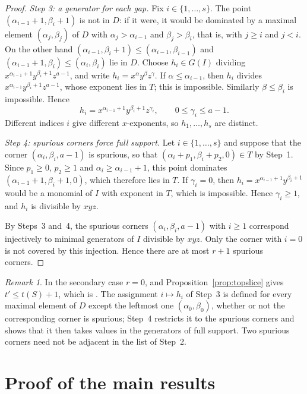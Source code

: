 \documentclass{amsart}
\theoremstyle{definition}
\theoremstyle{remark}
\newtheorem{remark}[theorem]{Remark}
\numberwithin{equation}{section}
\begin{document}
\begin{proof}
\emph{Step 3: a generator for each gap.} Fix $i\in\{1,\dots,s\}$. The point $(\alpha_{i-1}+1,\beta_i+1)$ is not in $D$: if it were, it would be dominated by a maximal element $(\alpha_j,\beta_j)$ of $D$ with $\alpha_j>\alpha_{i-1}$ and $\beta_j>\beta_i$, that is, with $j\ge i$ and $j<i$. On the other hand $(\alpha_{i-1},\beta_i+1)\le(\alpha_{i-1},\beta_{i-1})$ and $(\alpha_{i-1}+1,\beta_i)\le(\alpha_i,\beta_i)$ lie in $D$. Choose $h_i\in G(I)$ dividing $x^{\alpha_{i-1}+1}y^{\beta_i+1}z^{a-1}$, and write $h_i=x^{\alpha}y^{\beta}z^{\gamma}$. If $\alpha\le\alpha_{i-1}$, then $h_i$ divides $x^{\alpha_{i-1}}y^{\beta_i+1}z^{a-1}$, whose exponent lies in $T$; this is impossible. Similarly $\beta\le\beta_i$ is impossible. Hence
\[
h_i=x^{\alpha_{i-1}+1}y^{\beta_i+1}z^{\gamma_i},\qquad 0\le\gamma_i\le a-1 .
\]
Different indices $i$ give different $x$-exponents, so $h_1,\dots,h_s$ are distinct.

\emph{Step 4: spurious corners force full support.} Let $i\in\{1,\dots,s\}$ and suppose that the corner $(\alpha_i,\beta_i,a-1)$ is spurious, so that $(\alpha_i+p_1,\beta_i+p_2,0)\in T$ by Step~1. Since $p_1\ge0$, $p_2\ge1$ and $\alpha_i\ge\alpha_{i-1}+1$, this point dominates $(\alpha_{i-1}+1,\beta_i+1,0)$, which therefore lies in $T$. If $\gamma_i=0$, then $h_i=x^{\alpha_{i-1}+1}y^{\beta_i+1}$ would be a monomial of $I$ with exponent in $T$, which is impossible. Hence $\gamma_i\ge1$, and $h_i$ is divisible by $xyz$.

By Steps~3 and~4, the spurious corners $(\alpha_i,\beta_i,a-1)$ with $i\ge1$ correspond injectively to minimal generators of $I$ divisible by $xyz$. Only the corner with $i=0$ is not covered by this injection. Hence there are at most $r+1$ spurious corners.
\end{proof}

\begin{remark}
In the secondary case $r=0$, and Proposition~\ref{prop:topslice} gives $t'\le t(S)+1$, which is \cite[Lemma~4.5]{Cho26}. The assignment $i\mapsto h_i$ of Step~3 is defined for every maximal element of $D$ except the leftmost one $(\alpha_0,\beta_0)$, whether or not the corresponding corner is spurious; Step~4 restricts it to the spurious corners and shows that it then takes values in the generators of full support. Two spurious corners need not be adjacent in the list of Step~2.
\end{remark}

\section{Proof of the main results}\label{sec:proof}
\end{document}
